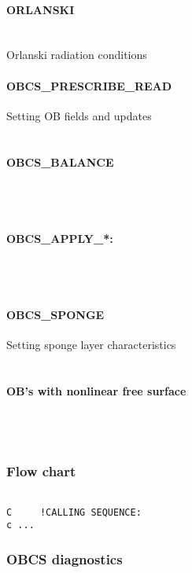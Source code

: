 \paragraph{ORLANSKI} ~ \\
%
Orlanski radiation conditions \citep{orl:76}

\paragraph{OBCS\_PRESCRIBE\_READ} Setting OB fields and updates \\
%
~

\paragraph{OBCS\_BALANCE} ~ \\
%
~

\paragraph{OBCS\_APPLY\_*:} ~ \\
~

\paragraph{OBCS\_SPONGE} Setting sponge layer characteristics \\
%
~

\paragraph{OB's with nonlinear free surface} ~ \\
%
~



\subsubsection{Flow chart
\label{sec:pkg:obcs:flowchart}}


{\footnotesize
\begin{verbatim}

C     !CALLING SEQUENCE:
c ...

\end{verbatim}
}


\subsubsection{OBCS diagnostics
\label{sec:pkg:obcs:diagnostics}}

